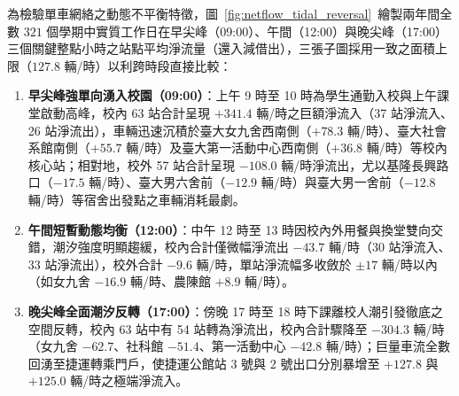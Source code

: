 為檢驗單車網絡之動態不平衡特徵，圖~\ref{fig:netflow_tidal_reversal}~繪製兩年間全數 $321$ 個學期中實質工作日在早尖峰（09:00）、午間（12:00）與晚尖峰（17:00）三個關鍵整點小時之站點平均淨流量（還入減借出），三張子圖採用一致之面積上限（$127.8$ 輛/時）以利跨時段直接比較：

\begin{enumerate}[label = \textbullet]
    \item \textbf{早尖峰強單向湧入校園（09:00）}：上午 9 時至 10 時為學生通勤入校與上午課堂啟動高峰，校內 63 站合計呈現 $+341.4$ 輛/時之巨額淨流入（37 站淨流入、26 站淨流出），車輛迅速沉積於臺大女九舍西南側（$+78.3$ 輛/時）、臺大社會系館南側（$+55.7$ 輛/時）及臺大第一活動中心西南側（$+36.8$ 輛/時）等校內核心站；相對地，校外 57 站合計呈現 $-108.0$ 輛/時淨流出，尤以基隆長興路口（$-17.5$ 輛/時）、臺大男六舍前（$-12.9$ 輛/時）與臺大男一舍前（$-12.8$ 輛/時）等宿舍出發點之車輛消耗最劇。
    \item \textbf{午間短暫動態均衡（12:00）}：中午 12 時至 13 時因校內外用餐與換堂雙向交錯，潮汐強度明顯趨緩，校內合計僅微幅淨流出 $-43.7$ 輛/時（30 站淨流入、33 站淨流出），校外合計 $-9.6$ 輛/時，單站淨流幅多收斂於 $\pm 17$ 輛/時以內（如女九舍 $-16.9$ 輛/時、農陳館 $+8.9$ 輛/時）。
    \item \textbf{晚尖峰全面潮汐反轉（17:00）}：傍晚 17 時至 18 時下課離校人潮引發徹底之空間反轉，校內 63 站中有 54 站轉為淨流出，校內合計驟降至 $-304.3$ 輛/時（女九舍 $-62.7$、社科館 $-51.4$、第一活動中心 $-42.8$ 輛/時）；巨量車流全數回湧至捷運轉乘門戶，使捷運公館站 3 號與 2 號出口分別暴增至 $+127.8$ 與 $+125.0$ 輛/時之極端淨流入。
\end{enumerate}

